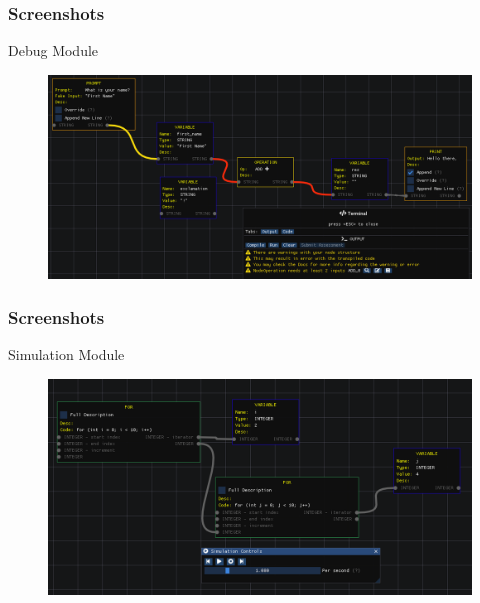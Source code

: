 \documentclass{beamer}
\begin{document}
\begin{frame}
	\frametitle{Screenshots}
	\begin{block}{Debug Module}
		\begin{figure}
				\includegraphics[width=1\textwidth]{../tex/media/sc_debug.png}
		\end{figure}
	\end{block}
\end{frame}

\begin{frame}
	\frametitle{Screenshots}
	\begin{block}{Simulation Module}
		\begin{figure}
				\includegraphics[width=1\textwidth]{../tex/media/sc_simulation.png}
		\end{figure}
	\end{block}
\end{frame}
\end{document}
